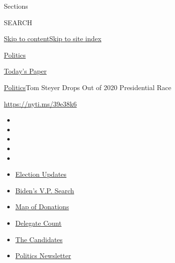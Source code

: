 Sections

SEARCH

\protect\hyperlink{site-content}{Skip to
content}\protect\hyperlink{site-index}{Skip to site index}

\href{https://www.nytimes.com/section/politics}{Politics}

\href{https://myaccount.nytimes.com/auth/login?response_type=cookie\&client_id=vi}{}

\href{https://www.nytimes.com/section/todayspaper}{Today's Paper}

\href{/section/politics}{Politics}\textbar{}Tom Steyer Drops Out of 2020
Presidential Race

\url{https://nyti.ms/39e38k6}

\begin{itemize}
\item
\item
\item
\item
\item
\end{itemize}

\begin{itemize}
\item
  \href{https://www.nytimes.com/2020/07/31/us/elections/biden-vs-trump.html?action=click\&pgtype=Article\&state=default\&region=TOP_BANNER\&context=storylines_menu}{Election
  Updates}
\item
  \href{https://www.nytimes.com/article/biden-vice-president-2020.html?action=click\&pgtype=Article\&state=default\&region=TOP_BANNER\&context=storylines_menu}{Biden's
  V.P. Search}
\item
  \href{https://www.nytimes.com/interactive/2020/07/24/us/politics/trump-biden-campaign-donors.html?action=click\&pgtype=Article\&state=default\&region=TOP_BANNER\&context=storylines_menu}{Map
  of Donations}
\item
  \href{https://www.nytimes.com/interactive/2020/us/elections/delegate-count-primary-results.html?action=click\&pgtype=Article\&state=default\&region=TOP_BANNER\&context=storylines_menu}{Delegate
  Count}
\item
  \href{https://www.nytimes.com/interactive/2019/us/politics/2020-presidential-candidates.html?action=click\&pgtype=Article\&state=default\&region=TOP_BANNER\&context=storylines_menu}{The
  Candidates}
\item
  \href{https://www.nytimes.com/newsletters/politics?action=click\&pgtype=Article\&state=default\&region=TOP_BANNER\&context=storylines_menu}{Politics
  Newsletter}
\end{itemize}

